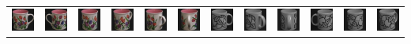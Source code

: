 \documentclass[dutch]{beamer}
\theoremstyle{definition}
\theoremstyle{remark}
\theoremstyle{example}
\begin{document}
{\begin{center}
\begin{tabular}{c@{\ }c@{}c@{}c@{}c@{}c c@{\ }c@{}c@{}c@{}c@{}c}
\includegraphics[width=0.8cm]{coil/beeld-6.eps} &
\includegraphics[width=0.8cm]{coil/beeld-7.eps} &
\includegraphics[width=0.8cm]{coil/beeld-8.eps} &
\includegraphics[width=0.8cm]{coil/beeld-9.eps} &
\includegraphics[width=0.8cm]{coil/beeld-10.eps} &
\includegraphics[width=0.8cm]{coil/beeld-11.eps} &

\includegraphics[width=0.8cm]{coil/beeld-48.eps} &
\includegraphics[width=0.8cm]{coil/beeld-49.eps} &
\includegraphics[width=0.8cm]{coil/beeld-50.eps} &
\includegraphics[width=0.8cm]{coil/beeld-51.eps} &
\includegraphics[width=0.8cm]{coil/beeld-52.eps} &
\includegraphics[width=0.8cm]{coil/beeld-53.eps} \\


\end{tabular}
\end{center}}
\end{document}
